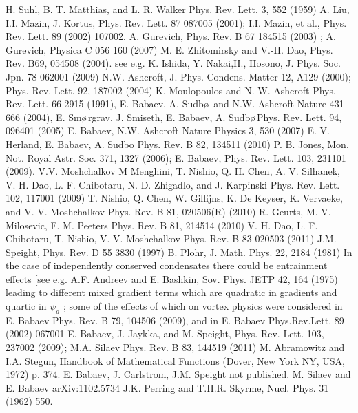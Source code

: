 \begin{thebibliography}{99}
     H. Suhl, B. T. Matthias, and L. R. Walker Phys. Rev. 
        Lett. 3, 552 (1959)
     A. Liu, I.I. Mazin, J. Kortus, Phys. Rev. Lett. 87 087005 
        (2001); I.I. Mazin, et al., Phys. Rev. Lett. 89 (2002) 107002.
     A. Gurevich, Phys. Rev. B 67 184515 (2003) ;
     A. Gurevich, Physica C 056 160 (2007)
     M. E. Zhitomirsky and V.-H. Dao, Phys. Rev. B69, 054508 
        (2004).
     see e.g. K. Ishida, Y. Nakai,H., Hosono, J. Phys. Soc. 
        Jpn. 78 062001 (2009)
     N.W. Ashcroft, J. Phys. Condens. Matter 12, A129 (2000); 
        Phys. Rev. Lett. 92, 187002 (2004) K. Moulopoulos and N. W. Ashcroft 
        Phys. Rev. Lett. 66 2915 (1991),
     E. Babaev, A. Sudb\o\,\! and N.W. Ashcroft Nature 431 666 
        (2004), E. Sm\o\,\!rgrav, J. Smiseth, E. Babaev, A. Sudb\o\,\!Phys. 
        Rev. Lett. 94, 096401 (2005) E. Babaev, N.W. Ashcroft Nature Physics 
        3, 530 (2007)
     E. V. Herland, E. Babaev, A. Sudbo Phys. Rev. B 82, 
        134511 (2010)
     P. B. Jones, Mon. Not. Royal Astr. Soc. 371, 1327 (2006); 
        E. Babaev, Phys. Rev. Lett. 103, 231101 (2009).
     V.V. Moshchalkov M Menghini, T. Nishio, Q. H. Chen, A. V. 
        Silhanek, V. H. Dao, L. F. Chibotaru, N. D. Zhigadlo, and J. Karpinski 
        Phys. Rev. Lett. 102, 117001 (2009)
     T. Nishio, Q. Chen, W. Gillijns, K. De Keyser, 
        K. Vervaeke, and V. V. Moshchalkov Phys. Rev. B 81, 020506(R) (2010)
     R. Geurts, M. V. Milosevic, F. M. Peeters Phys. Rev. 
        B 81, 214514 (2010) V. H. Dao, L. F. Chibotaru, T. Nishio, V. V. 
        Moshchalkov Phys. Rev. B 83 020503 (2011)
     J.M. Speight, Phys. Rev. D 55 3830 (1997)
     B. Plohr, J. Math. Phys. 22, 2184 (1981)
     In the case of independently conserved condensates there 
        could be entrainment effects [see e.g. A.F. Andreev and E. Bashkin, 
        Sov. Phys. JETP 42, 164 (1975) leading to different mixed gradient 
        terms which are quadratic in gradients and quartic in \( \psi_a \) ; 
        some of the effects of which on vortex physics were considered in 
        E. Babaev Phys. Rev. B 79, 104506 (2009), and in\cite{bib:14}
     E. Babaev Phys.Rev.Lett. 89 (2002) 067001 E. Babaev, 
        J. Jaykka, and M. Speight, Phys. Rev. Lett. 103, 237002 (2009); 
        M.A. Silaev Phys. Rev. B 83, 144519 (2011)
     M. Abramowitz and I.A. Stegun, Handbook of Mathematical 
        Functions (Dover, New York NY, USA, 1972) p. 374.
     E. Babaev, J. Carlstrom, J.M. Speight not published.
     M. Silaev and E. Babaev arXiv:1102.5734
     J.K. Perring and T.H.R. Skyrme, Nucl. Phys. 31 (1962) 550.
\end{thebibliography}

\newpage